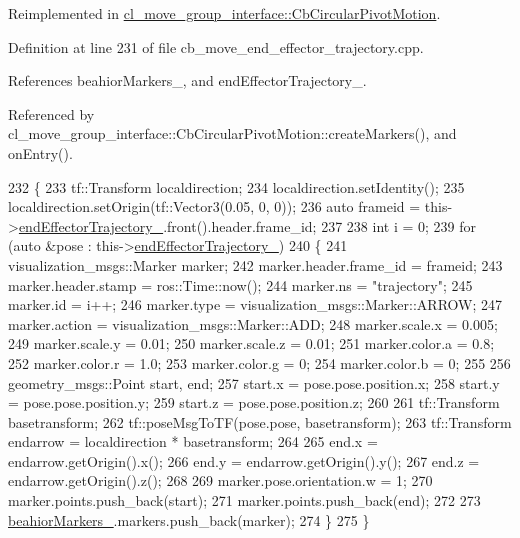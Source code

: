 Reimplemented in \hyperlink{classcl__move__group__interface_1_1CbCircularPivotMotion_a48911ad62608cb00c04e979e2f6f644a}{cl\+\_\+move\+\_\+group\+\_\+interface\+::\+Cb\+Circular\+Pivot\+Motion}.



Definition at line 231 of file cb\+\_\+move\+\_\+end\+\_\+effector\+\_\+trajectory.\+cpp.



References beahior\+Markers\+\_\+, and end\+Effector\+Trajectory\+\_\+.



Referenced by cl\+\_\+move\+\_\+group\+\_\+interface\+::\+Cb\+Circular\+Pivot\+Motion\+::create\+Markers(), and on\+Entry().


\begin{DoxyCode}
232     \{
233         tf::Transform localdirection;
234         localdirection.setIdentity();
235         localdirection.setOrigin(tf::Vector3(0.05, 0, 0));
236         \textcolor{keyword}{auto} frameid = this->\hyperlink{classcl__move__group__interface_1_1CbMoveEndEffectorTrajectory_ae13dfd31ea3660646e03882f0c2c29f0}{endEffectorTrajectory\_}.front().header.frame\_id;
237 
238         \textcolor{keywordtype}{int} i = 0;
239         \textcolor{keywordflow}{for} (\textcolor{keyword}{auto} &pose : this->\hyperlink{classcl__move__group__interface_1_1CbMoveEndEffectorTrajectory_ae13dfd31ea3660646e03882f0c2c29f0}{endEffectorTrajectory\_})
240         \{
241             visualization\_msgs::Marker marker;
242             marker.header.frame\_id = frameid;
243             marker.header.stamp = ros::Time::now();
244             marker.ns = \textcolor{stringliteral}{"trajectory"};
245             marker.id = i++;
246             marker.type = visualization\_msgs::Marker::ARROW;
247             marker.action = visualization\_msgs::Marker::ADD;
248             marker.scale.x = 0.005;
249             marker.scale.y = 0.01;
250             marker.scale.z = 0.01;
251             marker.color.a = 0.8;
252             marker.color.r = 1.0;
253             marker.color.g = 0;
254             marker.color.b = 0;
255 
256             geometry\_msgs::Point start, end;
257             start.x = pose.pose.position.x;
258             start.y = pose.pose.position.y;
259             start.z = pose.pose.position.z;
260 
261             tf::Transform basetransform;
262             tf::poseMsgToTF(pose.pose, basetransform);
263             tf::Transform endarrow = localdirection * basetransform;
264 
265             end.x = endarrow.getOrigin().x();
266             end.y = endarrow.getOrigin().y();
267             end.z = endarrow.getOrigin().z();
268 
269             marker.pose.orientation.w = 1;
270             marker.points.push\_back(start);
271             marker.points.push\_back(end);
272 
273             \hyperlink{classcl__move__group__interface_1_1CbMoveEndEffectorTrajectory_a809fb5385adf27c0a1c8f8136566949c}{beahiorMarkers\_}.markers.push\_back(marker);
274         \}
275     \}
\end{DoxyCode}
